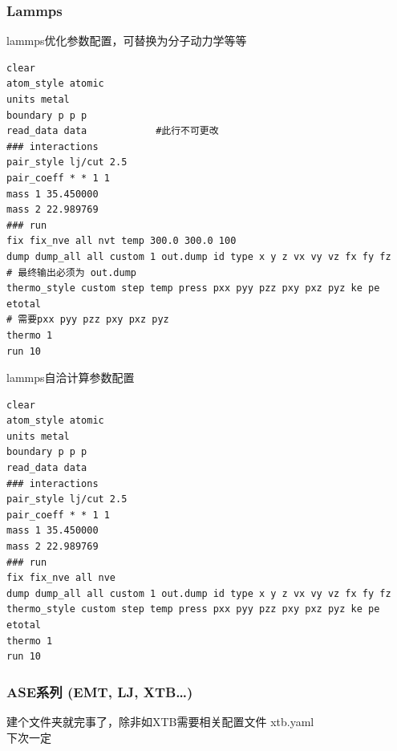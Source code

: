 \documentclass[12pt]{article}
\begin{document}
\subsubsection{Lammps}
\begin{tcolorbox}[enhanced, breakable,title = {in.relax}]
lammps优化参数配置，可替换为分子动力学等等
\tcblower
\begin{verbatim}                                
clear
atom_style atomic 
units metal
boundary p p p 
read_data data            #此行不可更改
### interactions
pair_style lj/cut 2.5 
pair_coeff * * 1 1 
mass 1 35.450000 
mass 2 22.989769 
### run 
fix fix_nve all nvt temp 300.0 300.0 100 
dump dump_all all custom 1 out.dump id type x y z vx vy vz fx fy fz
# 最终输出必须为 out.dump
thermo_style custom step temp press pxx pyy pzz pxy pxz pyz ke pe etotal
# 需要pxx pyy pzz pxy pxz pyz
thermo 1
run 10
\end{verbatim}
\end{tcolorbox}
\begin{tcolorbox}[enhanced, breakable, title = {in.scf}]
lammps自洽计算参数配置
\tcblower
\begin{verbatim}                               
clear
atom_style atomic 
units metal
boundary p p p 
read_data data
### interactions
pair_style lj/cut 2.5 
pair_coeff * * 1 1 
mass 1 35.450000 
mass 2 22.989769 
### run 
fix fix_nve all nve 
dump dump_all all custom 1 out.dump id type x y z vx vy vz fx fy fz
thermo_style custom step temp press pxx pyy pzz pxy pxz pyz ke pe etotal
thermo 1
run 10
\end{verbatim}
\end{tcolorbox}
\subsubsection{ASE系列 (EMT, LJ, XTB\dots)}
\begin{tcolorbox}[enhanced, breakable, title = {EMT, LJ, XTB\dots}]
建个文件夹就完事了，除非如XTB需要相关配置文件
\tcblower
xtb.yaml \\下次一定
\end{tcolorbox}
\end{document}
